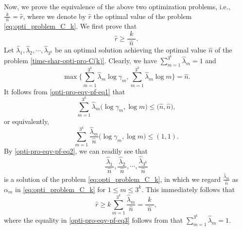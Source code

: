 \documentclass[11pt,draftclsnofoot,onecolumn]{IEEEtran}
\begin{document}
\begin{journalonly}
{{\color{red}
Now, we prove the equivalence of the above two optimization problems, i.e.,
$\frac{k}{\,\,\widehat{n}\,\,}=\widehat{r}$, where we denote by $\widehat{r}$ the optimal value of the problem \eqref{eq:opti_problem_C_k}.  We first prove that
\begin{equation}
\widehat{r}\geq \frac{k}{\,\,\widehat{n}\,\,}.
\end{equation}
Let $\widehat{\lambda}_1,\widehat{\lambda}_2,\cdots,\widehat{\lambda}_{3^k}$ be an optimal solution achieving the optimal value $\widehat{n}$ of the problem \eqref{time-shar-opti-pro-C(k)}. Clearly, we have $\sum_{m=1}^{3^{k}}\widehat{\lambda}_{m}=1$ and
\begin{equation}
\max\Bigg\{\sum_{m=1}^{3^{k}}\widehat{\lambda}_{m}\log\gamma_{m},
\sum_{m=1}^{3^{k}}\widehat{\lambda}_{m}\log m\Bigg\}=\widehat{n}.\label{opti-pro-eqv-pf-eq1}
\end{equation}
It follows from \eqref{opti-pro-eqv-pf-eq1} that
\begin{equation}
\sum_{m=1}^{3^{k}}\widehat{\lambda}_{m}\big(\log\gamma_{m},
\log m\big)\leq\big(\widehat{n},\widehat{n}\big),
\end{equation}
or equivalently,
\begin{equation}
\sum_{m=1}^{3^{k}}\frac{\widehat{\lambda}_{m}}{\widehat{n}}\big(\log\gamma_{m},
\log m\big)\leq(1,1).\label{opti-pro-eqv-pf-eq2}
\end{equation}
By \eqref{opti-pro-eqv-pf-eq2}, we can readily see that $$\frac{\widehat{\lambda}_{1}}{\,\,\widehat{n}\,\,},\frac{\widehat{\lambda}_{2}}{\,\,\widehat{n}\,\,},\cdots,
\frac{\widehat{\lambda}_{3^k}}{\,\,\widehat{n}\,\,}$$ is a solution of the problem \eqref{eq:opti_problem_C_k}, in which we regard $\frac{\widehat{\lambda}_{m}}{\widehat{n}}$ as $\alpha_m$ in \eqref{eq:opti_problem_C_k} for $1\leq m\leq 3^k$. This immediately follows that
\begin{equation}
\widehat{r}\geq k\sum_{m=1}^{3^{k}}\frac{\widehat{\lambda}_{m}}{\widehat{n}}=\frac{k}{\,\,\widehat{n}\,\,},
\label{opti-pro-eqv-pf-eq3}
\end{equation}
where the equality in \eqref{opti-pro-eqv-pf-eq3} follows from that $\sum_{m=1}^{3^{k}}\widehat{\lambda}_{m}=1$.

}}
\end{journalonly}
\end{document}
